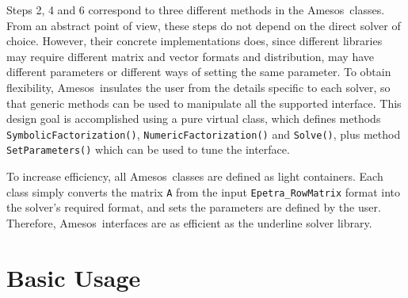\documentclass[11pt]{SANDreport}
\newcommand{\amesos}{{\sc Amesos}}
\begin{document}
Steps 2, 4 and 6 correspond to three different methods in the \amesos\ classes.
From an abstract point of view, these steps do not depend on the direct
solver of choice. However, their concrete implementations does, since different
libraries may require different matrix and vector formats and distribution,
may have different parameters or different ways of setting the same parameter.
To obtain flexibility, \amesos\ insulates 
the user from the details specific to each solver, so that generic
methods can be used to manipulate all the supported interface. This design
goal is accomplished using a pure virtual class, which defines
methods \verb!SymbolicFactorization()!, \verb!NumericFactorization()! and
\verb!Solve()!, plus method \verb!SetParameters()! which can be used to tune
the interface.

To increase efficiency, all \amesos\ classes are defined as light containers.
Each class simply converts the matrix \verb!A! from the input
\verb!Epetra_RowMatrix! format into the solver's required format, and sets the
parameters are defined by the user. Therefore, \amesos\ interfaces are as
efficient as the underline solver library.

\section{Basic Usage}
\label{sec:basic}
\end{document}

